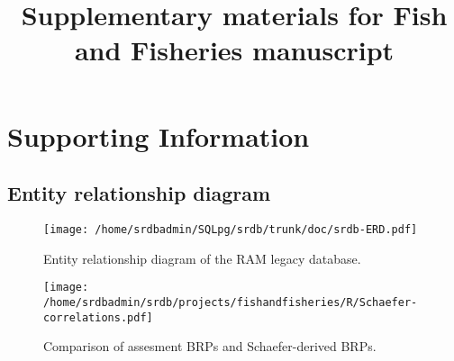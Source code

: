 \documentclass[letterpaper,12pt]{article}
\title{Supplementary materials for Fish and Fisheries manuscript}
\begin{document}
\maketitle{}


\section*{Supporting Information}

\subsection*{Entity relationship diagram}
\begin{figure}
\begin{center}
\texttt{[image: /home/srdbadmin/SQLpg/srdb/trunk/doc/srdb-ERD.pdf]}
\end{center}
\caption{Entity relationship diagram of the RAM legacy database.}\label{fig:ERD}
\end{figure}

\begin{figure}
\begin{center}
\texttt{[image: /home/srdbadmin/srdb/projects/fishandfisheries/R/Schaefer-correlations.pdf]}
\end{center}
\caption{Comparison of assesment BRPs and Schaefer-derived BRPs.}\label{fig:corr}
\end{figure}


\begin{tiny}
\begin{landscape}

\end{landscape}
\end{tiny}

%



\end{document}
